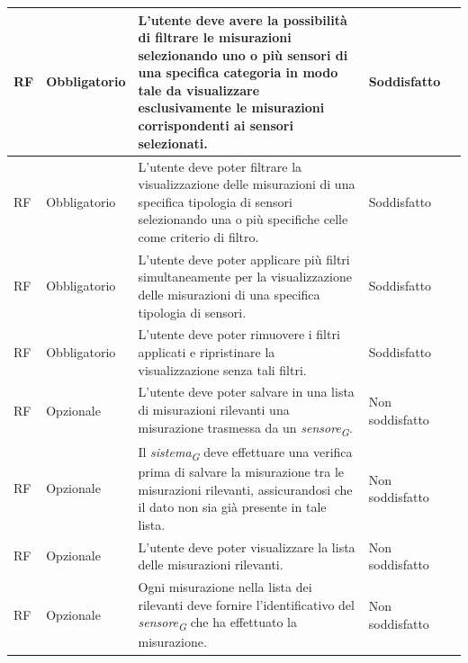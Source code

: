 \begin{longtable}{|C{1.5cm}|C{2cm}|L{5cm}|C{2cm}|C{1.5cm}|}
    \hline
     RF & Obbligatorio & L'utente deve avere la possibilità di filtrare le misurazioni selezionando uno o più sensori di una specifica categoria in modo tale da visualizzare esclusivamente le misurazioni corrispondenti ai sensori selezionati.& Soddisfatto \\
    
    \hline
     RF & Obbligatorio & L'utente deve poter filtrare la visualizzazione delle misurazioni di una specifica tipologia di sensori selezionando una o più specifiche celle come criterio di filtro.& Soddisfatto \\
    
    \hline
     RF & Obbligatorio & L'utente deve poter applicare più filtri simultaneamente per la visualizzazione delle misurazioni di una specifica tipologia di sensori.& Soddisfatto \\
    
    \hline
     RF & Obbligatorio & L'utente deve poter rimuovere i filtri applicati e ripristinare la visualizzazione senza tali filtri.& Soddisfatto \\

    \hline
     RF & Opzionale & L'utente deve poter salvare in una lista di misurazioni rilevanti una misurazione trasmessa da un \textit{sensore}\textsubscript{\textit{G}}.& Non soddisfatto \\
    
    \hline
     RF & Opzionale & Il \textit{sistema}\textsubscript{\textit{G}} deve effettuare una verifica prima di salvare la misurazione tra le misurazioni rilevanti, assicurandosi che il dato non sia già presente in tale lista.& Non soddisfatto \\
    
    \hline
     RF & Opzionale & L'utente deve poter visualizzare la lista delle misurazioni rilevanti.& Non soddisfatto \\
    
    \hline
     RF & Opzionale & Ogni misurazione nella lista dei rilevanti deve fornire l'identificativo del \textit{sensore}\textsubscript{\textit{G}} che ha effettuato la misurazione.& Non soddisfatto \\


\end{longtable}
